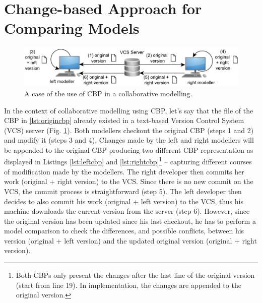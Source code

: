 \documentclass{llncs}
\begin{document}
\vspace{-20pt}
\section{Change-based Approach for Comparing Models}
\label{sec:change_based_approach_for_comparing_models}

\vspace{-20pt}
 \begin{figure}
    \includegraphics[width=\linewidth]{images/VCS}
    \caption{A case of the use of CBP in a collaborative modelling.}
    \label{fig:vcs}
\end{figure}

\vspace{-10pt}
In the context of collaborative modelling using CBP, let's say that the file of the CBP in \ref{lst:origincbp} already existed in a text-based Version Control System (VCS) server (Fig. \ref{fig:vcs}). Both modellers checkout the original CBP (steps 1 and 2) and modify it (steps 3 and 4). Changes made by the left and right modellers will be appended to the original CBP producing two different CBP representation as displayed in Listings \ref{lst:leftcbp} and \ref{lst:rightcbp}\footnote{Both CBPs only present the changes after the last line of the original version (start from line 19). In implementation, the changes are appended to the original version.} -- capturing different courses of modification made by the modellers. The right developer then commits her work (original + right version) to the VCS. Since there is no new commit on the VCS, the commit process is straightforward (step 5). The left developer then decides to also commit his work (original + left version) to the VCS, thus his machine downloads the current version from the server (step 6). However, since the original version has been updated since his last checkout, he has to perform a model comparison to check the differences, and possible conflicts, between his version (original + left version) and the updated original version (original + right version). 
\end{document}
